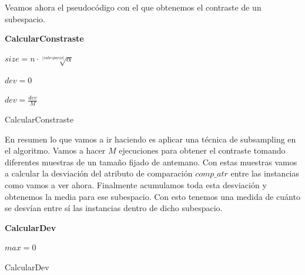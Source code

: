 Veamos ahora el pseudocódigo con el que obtenemos el contraste de un subespacio.

\begin{algorithm}[H]{\textbf{CalcularConstraste}}
	
	
	$size = n \cdot \sqrt[|subespacio|]{\alpha}$
	
	$dev=0$
	

	$dev = \frac{dev}{M}$
	
	
	\caption{CalcularConstraste}
	\label{calcula_contraste}
\end{algorithm}

En resumen lo que vamos a ir haciendo es aplicar una técnica de subsampling en el algoritmo. Vamos a hacer $M$ ejecuciones para obtener el contraste tomando diferentes muestras de un tamaño fijado de antemano. Con estas muestras vamos a calcular la desviación del atributo de comparación $comp\_atr$ entre las instancias como vamos a ver ahora. Finalmente acumulamos toda esta desviación y obtenemos la media para ese subespacio. Con esto tenemos una medida de cuánto se desvían entre sí las instancias dentro de dicho subespacio.

\begin{algorithm}[H]{\textbf{CalcularDev}}
	
	
	$max = 0$
	
	
	
	\caption{CalcularDev}
	\label{calcular_dev}
\end{algorithm}

